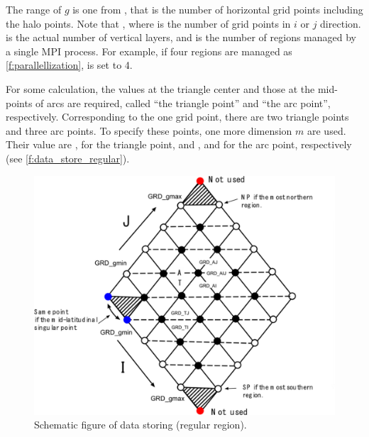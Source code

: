 The range of $g$ is one from , that is the number of
horizontal grid points including the halo points.
%
Note that ,
where  is the number of grid points in $i$ or $j$ direction.
%
 is the actual number of vertical layers, and
 is the number of regions managed by a single MPI process.
%
For example, if four regions are managed as \autoref{f:parallellization},
 is set to 4.

For some calculation, the values at the triangle center and those at the
mid-points of arcs are required, called ``the triangle point'' and ``the
arc point'', respectively.
%
Corresponding to the one grid point, there are two triangle points and
three arc points.
%
To specify these points, one more dimension $m$ are used. Their value
are ,  for the triangle point, and ,
 and  for the arc point, respectively (see
\autoref{f:data_store_regular}).





\begin{figure}[htbp]
 \centering
\includegraphics[scale=.5]{figs/Tomita2-12-0.png}
\caption{Schematic figure of data storing (regular region).}%
\label{f:data_store_regular}
\end{figure}



